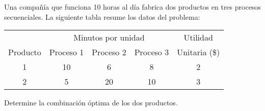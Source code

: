 \begin{frameact}{}{}
\label{act:taha_02-02A-04}
  Una compañía que funciona 10 horas al día fabrica dos productos en tres procesos secuenciales. La siguiente tabla resume los datos del problema:

  {
    \centering
    \begin{tabular}{ccccc}
      \toprule
      &\multicolumn{3}{c}{Minutos por unidad}&Utilidad\\
      \cmidrule{2-4}
      Producto& Proceso 1& Proceso 2& Proceso 3& Unitaria (\$)\\
      \midrule
1&10&6&8&2\\
      2&5&20&10&3\\
      \bottomrule
    \end{tabular}
    \par
  }
  
  Determine la combinación óptima de los dos productos.
\end{frameact}


